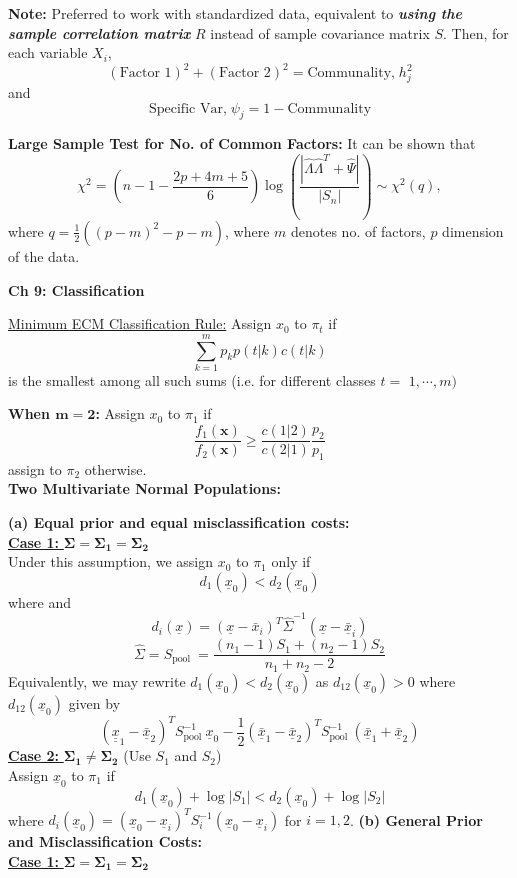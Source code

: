 \documentclass[a4paper]{article}
\newcommand{\subheading}[1]{{\scriptsize\textbf{#1}}}
\begin{document}
\begin{multicols*}{4}
\textbf{Note:} Preferred to work with standardized data, equivalent to \textit{\textbf{using the sample correlation matrix}} $R$ instead of sample covariance matrix $S$.
\smallskip
Then, for each variable $X_i$, $$(\text{Factor 1})^2 + (\text{Factor 2})^2 = \text{Communality,} \; h_j^2$$
and
$$
\text{Specific Var,} \; \psi_j = 1 - \text{Communality}
$$

\textbf{Large Sample Test for No. of Common Factors:}
It can be shown that
$$
\chi^2=\left(n-1-\frac{2 p+4 m+5}{6}\right) \log \left(\frac{\left|\widehat{\Lambda} \widehat{\Lambda}^T+\widehat{\Psi}\right|}{\left|S_n\right|}\right) \sim \chi^2(q),
$$
where $q=\frac{1}{2}\left((p-m)^2-p-m\right)$, where $m$ denotes no. of factors, $p$ dimension of the data.


\smallskip
\hline
\smallskip
\subheading{Ch 9: Classification}

\underline{Minimum ECM Classification Rule:} Assign $x_0$ to $\pi_t$ if
$$
\sum_{k=1}^m p_k p(t|k) c(t|k)
$$
is the smallest among all such sums (i.e. for different classes $t=$ $1, \cdots, m)$

\textbf{When $\mathbf{m=2}$:} Assign $x_0$ to $\pi_1$ if
$$\frac{f_1(\mathbf{x})}{f_2(\mathbf{x})} \geq \frac{c(1 | 2)}{c(2 | 1)} \frac{p_2}{p_1}$$
assign to $\pi_2$ otherwise. \\ \smallskip
\subheading{Two Multivariate Normal Populations:}

\textbf{(a) Equal prior and equal misclassification costs:} \\
\underline{\textbf{Case 1:} $\mathbf{\Sigma = \Sigma_1 = \Sigma_2}$} \\

Under this assumption, we assign $x_0$ to $\pi_1$ only if
$$
d_1\left(\underline{x}_0\right)<d_2\left(\underline{x}_0\right)
$$
where
and
$$
d_i(\underline{x})=\left(\underline{x}-\bar{x}_i\right)^T \hat{\Sigma}^{-1}\left(\underline{x}-\underline{\bar{x}}_i\right)
$$
$$
\hat{\Sigma}=S_{\text {pool }}=\frac{\left(n_1-1\right) S_1+\left(n_2-1\right) S_2}{n_1+n_2-2}
$$
Equivalently, we may rewrite $d_1\left(\underline{x}_0\right)<d_2\left(\underline{x}_0\right)$ as $d_{12}\left(\underline{x}_0\right)>0$ where $d_{12}\left(\underline{x}_0\right)$ given by
$$
\left(\underline{\underline{x}}_1-\underline{\bar{x}}_2\right)^T S_{\text {pool }}^{-1} \underline{x}_0-\frac{1}{2}\left(\underline{\bar{x}}_1-\underline{\bar{x}}_2\right)^T S_{\text {pool }}^{-1}\left(\underline{\bar{x}}_1+\underline{\bar{x}}_2\right)
$$
\underline{\textbf{Case 2:} $\mathbf{\Sigma_1 \neq \Sigma_2}$} (Use $S_1$ and $S_2$) \\
Assign $\underline{x}_0$ to $\pi_1$ if
$$
d_1\left(\underline{x}_0\right)+\log \left|S_1\right|<d_2\left(\underline{x}_0\right)+\log \left|S_2\right|
$$
where $d_i\left(\underline{x}_0\right)=\left(\underline{x}_0-\underline{x}_i\right)^T S_i^{-1}\left(\underline{x}_0-\underline{x}_i\right)$ for $i=1,2$.
\smallskip
\textbf{(b) General Prior and Misclassification Costs:} \\
\underline{\textbf{Case 1:} $\mathbf{\Sigma = \Sigma_1 = \Sigma_2}$} \\


\end{multicols*}
\end{document}
